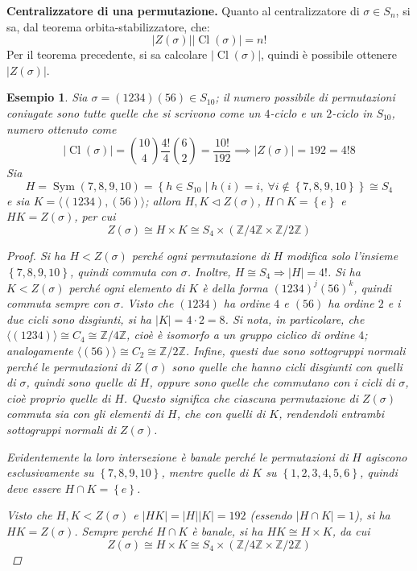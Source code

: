 \documentclass[12pt]{scrartcl}
\theoremstyle{style}
\newtheorem{esempio}{Esempio}[section]
\numberwithin{equation}{subsection}
\renewcommand{\textbf}[1]{\textsf{\bfseries #1}}
\begin{document}
\textbf{Centralizzatore di una permutazione.} Quanto al centralizzatore di $\sigma \in S_n$, si sa, dal teorema orbita-stabilizzatore, che:
\begin{equation}
\lvert Z(\sigma ) \rvert \lvert \operatorname{Cl} (\sigma ) \rvert = n!
\end{equation}
Per il teorema precedente, si sa calcolare $\lvert \operatorname{Cl} (\sigma ) \rvert $, quindi \`e possibile ottenere $\lvert Z(\sigma ) \rvert $.
\begin{esempio}
Sia $\sigma = (1234)(56) \in S_{10}$; il numero possibile di permutazioni coniugate sono tutte quelle che si scrivono come un $4$-ciclo e un $2$-ciclo in $S_{10}$, numero ottenuto come
\[
	\lvert \operatorname{Cl} (\sigma ) \rvert  = \binom{10}{4}\frac{4!}{4} \binom{6}{2}= \frac{10!}{192}\implies \lvert Z(\sigma ) \rvert = 192 = 4! 8
\] 
Sia
\[
H = \operatorname{Sym} \left(7,8,9,10\right) =\left\{ h \in S_{10}  \mid h(i) = i, \ \forall i \not \in \left\{ 7,8,9,10 \right\}  \right\} \cong S_4
\] 
e sia $K = \langle (1234),(56) \rangle$; allora $H,K \lhd Z(\sigma )$, $H\cap K = \left\{ e \right\} $ e $HK=Z(\sigma )$, per cui
\[
Z(\sigma ) \cong H \times K \cong S_4 \times (\mathbb{Z}/4\mathbb{Z} \times \mathbb{Z}/2\mathbb{Z})
\] 
\begin{proof}
	Si ha $H <Z(\sigma )$ perch\'e ogni permutazione di $H$ modifica solo l'insieme $\left\{ 7,8,9,10 \right\} $, quindi commuta con $\sigma $. Inoltre, $H \cong S_4 \Rightarrow \lvert H \rvert  = 4!$.
	Si ha $K<Z(\sigma )$ perch\'e ogni elemento di $K$ \`e della forma $(1234)^j(56)^k$, quindi commuta sempre con $\sigma $.
	Visto che $(1234)$ ha ordine $4$ e $(56)$ ha ordine $2$ e i due cicli sono disgiunti, si ha $\lvert K \rvert = 4 \cdot 2=8$.
	Si nota, in particolare, che $\langle (1234) \rangle\cong C_4\cong\mathbb{Z}/4\mathbb{Z}$, cio\`e \`e isomorfo a un gruppo ciclico di ordine $4$; analogamente $\langle (56) \rangle\cong C_2\cong\mathbb{Z}/2\mathbb{Z}$.
	Infine, questi due sono sottogruppi normali perch\'e le permutazioni di $Z(\sigma )$ sono quelle che hanno cicli disgiunti con quelli di $\sigma $, quindi sono quelle di $H$, oppure sono quelle che commutano con i cicli di $\sigma $, cio\`e proprio quelle di $H$.
	Questo significa che ciascuna permutazione di $Z(\sigma )$ commuta sia con gli elementi di $H$, che con quelli di $K$, rendendoli entrambi sottogruppi normali di $Z(\sigma )$.

	Evidentemente la loro intersezione \`e banale perch\'e le permutazioni di $H$ agiscono esclusivamente su $\left\{ 7,8,9,10 \right\} $, mentre quelle di $K$ su $\left\{ 1,2,3,4,5,6 \right\} $, quindi deve essere $H\cap K = \left\{ e \right\} $.

	Visto che $H,K < Z(\sigma )$ e $\lvert HK \rvert = \lvert H \rvert \lvert K \rvert =192 $ (essendo $\lvert H\cap K \rvert = 1$), si ha $HK = Z(\sigma )$.
	Sempre perch\'e $H\cap K$ \`e banale, si ha $HK \cong H \times K$, da cui
	\[
	Z(\sigma ) \cong H \times K \cong S_4 \times (\mathbb{Z}/4\mathbb{Z} \times  \mathbb{Z}/2\mathbb{Z})
	\] 
\end{proof}
\end{esempio}
\end{document}
